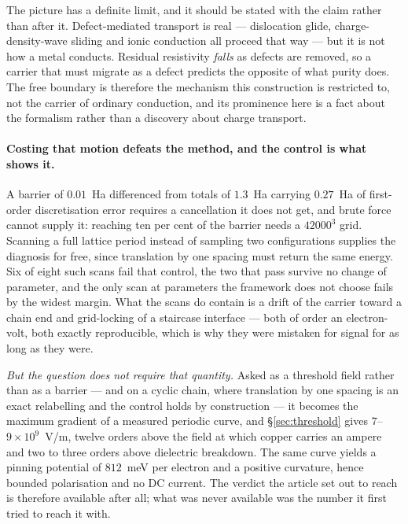 \documentclass[11pt]{article}
\begin{document}
The picture has a definite limit, and it should be stated with the claim rather than after it.
Defect-mediated transport is real --- dislocation glide, charge-density-wave sliding and ionic
conduction all proceed that way --- but it is not how a metal conducts. Residual resistivity
\emph{falls} as defects are removed, so a carrier that must migrate as a defect predicts the
opposite of what purity does. The free boundary is therefore the mechanism this construction is
restricted to, not the carrier of ordinary conduction, and its prominence here is a fact about the
formalism rather than a discovery about charge transport.

\paragraph{Costing that motion defeats the method, and the control is what shows it.} A barrier of
$0.01$~Ha differenced from totals of $1.3$~Ha carrying $0.27$~Ha of first-order discretisation error
requires a cancellation it does not get, and brute force cannot supply it: reaching ten per cent of
the barrier needs a $42000^3$ grid. Scanning a full lattice period instead of sampling two
configurations supplies the diagnosis for free, since translation by one spacing must return the
same energy. Six of eight such scans fail that control, the two that pass survive no change of
parameter, and the only scan at parameters the framework does not choose fails by the widest margin.
What the scans do contain is a drift of the carrier toward a chain end and grid-locking of a
staircase interface --- both of order an electron-volt, both exactly reproducible, which is why they
were mistaken for signal for as long as they were.

\emph{But the question does not require that quantity.} Asked as a threshold field rather than as a
barrier --- and on a cyclic chain, where translation by one spacing is an exact relabelling and the
control holds by construction --- it becomes the maximum gradient of a measured periodic curve, and
\S\ref{sec:threshold} gives $7$--$9\times10^{9}$~V/m, twelve orders above the field at which copper
carries an ampere and two to three orders above dielectric breakdown. The same curve yields a
pinning potential of $812$~meV per electron and a positive curvature, hence bounded polarisation and
no DC current. The verdict the article set out to reach is therefore available after all; what was
never available was the number it first tried to reach it with.
\end{document}
